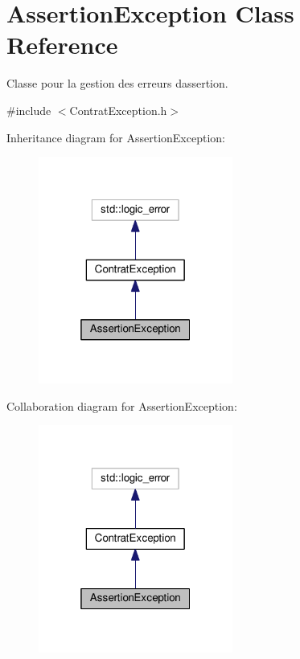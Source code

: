 \hypertarget{classAssertionException}{}\section{Assertion\+Exception Class Reference}
\label{classAssertionException}


Classe pour la gestion des erreurs d\textquotesingle{}assertion.  




{\ttfamily \#include $<$Contrat\+Exception.\+h$>$}



Inheritance diagram for Assertion\+Exception\+:\nopagebreak
\begin{figure}[H]
\begin{center}
\leavevmode
\includegraphics[width=181pt]{classAssertionException__inherit__graph}
\end{center}
\end{figure}


Collaboration diagram for Assertion\+Exception\+:\nopagebreak
\begin{figure}[H]
\begin{center}
\leavevmode
\includegraphics[width=181pt]{classAssertionException__coll__graph}
\end{center}
\end{figure}
